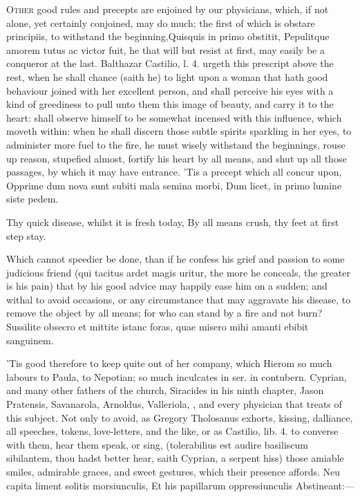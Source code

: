 \lettrine{O}{ther} good rules and precepts are enjoined by our physicians, which, if
not alone, yet certainly conjoined, may do much; the first of which is
obstare principiis, to withstand the beginning,Quisquis in primo
obstitit, Pepulitque amorem tutus ac victor fuit, he that will but
resist at first, may easily be a conqueror at the last. Balthazar
Castilio, l. 4. urgeth this prescript above the rest, when he
shall chance (saith he) to light upon a woman that hath good behaviour
joined with her excellent person, and shall perceive his eyes with a
kind of greediness to pull unto them this image of beauty, and carry it
to the heart: shall observe himself to be somewhat incensed with this
influence, which moveth within: when he shall discern those subtle
spirits sparkling in her eyes, to administer more fuel to the fire, he
must wisely withstand the beginnings, rouse up reason, stupefied
almost, fortify his heart by all means, and shut up all those passages,
by which it may have entrance. 'Tis a precept which all concur upon,
Opprime dum nova sunt subiti mala semina morbi,
Dum licet, in primo lumine siste pedem.

Thy quick disease, whilst it is fresh today,
By all means crush, thy feet at first step stay.

Which cannot speedier be done, than if he confess his grief and passion
to some judicious friend (qui tacitus ardet magis uritur, the
more he conceals, the greater is his pain) that by his good advice may
happily ease him on a sudden; and withal to avoid occasions, or any
circumstance that may aggravate his disease, to remove the object by
all means; for who can stand by a fire and not burn?
Sussilite obsecro et mittite istanc foras,
quae misero mihi amanti ebibit sanguinem.

'Tis good therefore to keep quite out of her company, which Hierom so
much labours to Paula, to Nepotian; \Chrysostom{} so much inculcates in
ser. in contubern. Cyprian, and many other fathers of the church,
Siracides in his ninth chapter, Jason Pratensis, Savanarola, Arnoldus,
Valleriola, \etc{}, and every physician that treats of this subject. Not
only to avoid, as  Gregory Tholosanus exhorts, kissing,
dalliance, all speeches, tokens, love-letters, and the like, or as
Castilio, lib. 4. to converse with them, hear them speak, or sing,
(tolerabilius est audire basiliscum sibilantem, thou hadst better hear,
saith Cyprian, a serpent hiss) those amiable smiles,
admirable graces, and sweet gestures, which their presence affords.
Neu capita liment solitis morsiunculis,
Et his papillarum oppressiunculis
Abstineant:---

